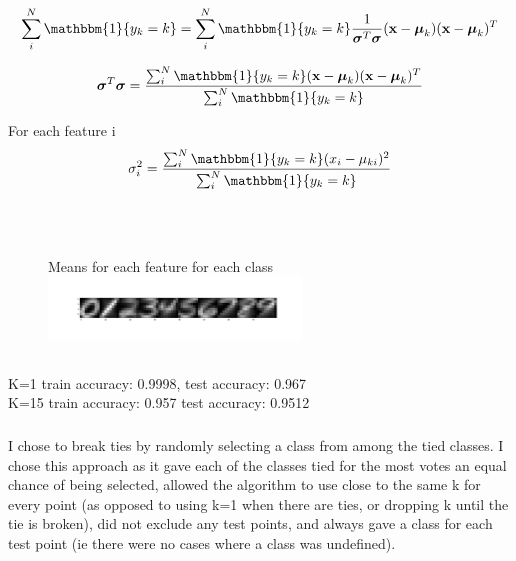 \documentclass[12pt,letterpaper]{article} %
\newcommand{\bs}[1]{\bm{\mathrm{#1}}} %
\newcommand{\switch}[0]{\mathbbm{1}\{y_k=k\}}
\begin{document}
  \begin{equation*}
\sum^N_i\switch  = \sum^N_i\switch\frac{1}{\bs{\sigma}^T\bs{\sigma}}(\bs{x}-\bs{\mu}_k)(\bs{x}-\bs{\mu}_k)^T
 \end{equation*}
 
   \begin{equation*}
\bs{\sigma}^T\bs{\sigma} = \frac{\sum^N_i\switch(\bs{x}-\bs{\mu}_k)(\bs{x}-\bs{\mu}_k)^T}{\sum^N_i\switch}
 \end{equation*}
 
 For each feature i
 \begin{equation*}
\sigma^2_i = \frac{\sum^N_i\switch(x_i-\mu_{ki})^2}{\sum^N_i\switch}
 \end{equation*}
 \
 \section{}
 
  \subsubsection{}
  \begin{figure}[!h]
  \centering
  \caption{}{ Means for each feature for each class}
   \includegraphics[width=0.6\textwidth, trim={3in 0in 0in 0in},clip=true ]{q0_means.png}
\end{figure}
\FloatBarrier

\subsection{}
 \subsubsection{}
 K=1 train accuracy: 0.9998, test accuracy: 0.967 \\
 K=15 train accuracy: 0.957 test accuracy: 0.9512\\
 
 \subsubsection {}
 
 I chose to break ties by randomly selecting a class from among the tied classes. I chose this approach as it gave each of the classes tied for the most votes an equal chance of being selected, allowed the algorithm to use close to the same k for every point (as opposed to using k=1 when there are ties, or dropping k until the tie is broken), did not exclude any test points, and always gave a class for each test point (ie there were no cases where a class was undefined). 
 
\end{document}
